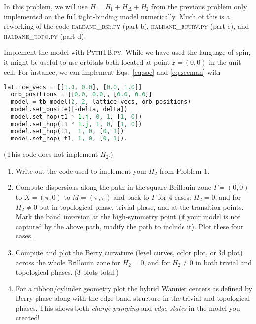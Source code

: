 \documentclass{jhwhw}
\begin{document}

In this problem, we will use $H = H_{1} + H_{\Delta} + H_{2}$ from the previous problem only implemented on the full tight-binding model numerically.
Much of this is a reworking of the code \textsc{haldane\_bsr.py} (part b), \textsc{haldane\_bcurv.py} (part c), and \textsc{haldane\_topo.py} (part d).

Implement the model with \textsc{PythTB.py}. While we have used the language of spin, it might be useful to use orbitals both located at point $\mathbf r = (0,0)$ in the unit cell. For instance, we can implement Eqs.~\eqref{eq:soc} and \eqref{eq:zeeman} with
\begin{lstlisting}[language=Python]
  lattice_vecs = [[1.0, 0.0], [0.0, 1.0]]
  orb_positions = [[0.0, 0.0], [0.0, 0.0]]
  model = tb_model(2, 2, lattice_vecs, orb_positions)
  model.set_onsite([-delta, delta])
  model.set_hop(t1 * 1.j, 0, 1, [1, 0])
  model.set_hop(t1 * 1.j, 1, 0, [1, 0])
  model.set_hop(t1,  1, 0, [0, 1])
  model.set_hop(-t1, 1, 0, [0, 1]).
\end{lstlisting}
(This code does not implement $H_{2}$.)

\begin{enumerate}
  \item Write out the code used to implement your $H_{2}$ from Problem 1.
  \item Compute dispersions along the path in the square Brillouin zone $\Gamma = (0,0)$ to $X = (\pi, 0)$ to $M = (\pi, \pi)$ and back to $\Gamma$ for 4 cases: $H_{2} = 0$, and for $H_{2} \neq 0$ but in topological phase, trivial phase, and at the transition points. Mark the band inversion at the high-symmetry point (if your model is not captured by the above path, modify the path to include it). Plot these four cases.
  \item
  Compute and plot the Berry curvature (level curves, color plot, or 3d plot) across the whole Brillouin zone for $H_{2} = 0$, and for $H_{2} \neq 0$ in both trivial and topological phases. (3 plots total.)
  \item For a ribbon/cylinder geometry plot the hybrid Wannier centers as defined by Berry phase along with the edge band structure in the trivial and topological phases. This shows both \emph{charge pumping} and \emph{edge states} in the model you created!
\end{enumerate}
\end{document}
